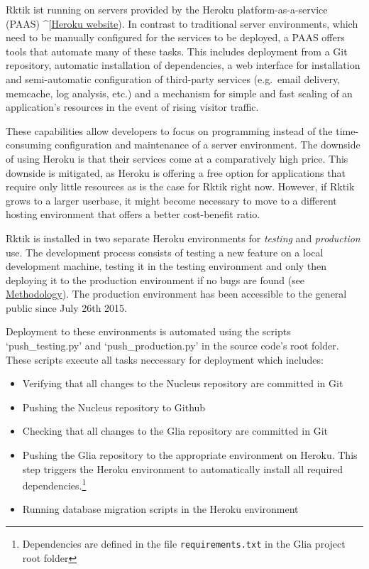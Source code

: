 
Rktik ist running on servers provided by the Heroku
platform-as-a-service (PAAS) \^{}{[}\href{https://www.heroku.com}{Heroku
website}). In contrast to traditional server environments, which need to
be manually configured for the services to be deployed, a PAAS offers
tools that automate many of these tasks. This includes deployment from a
Git repository, automatic installation of dependencies, a web interface
for installation and semi-automatic configuration of third-party
services (e.g.~email delivery, memcache, log analysis, etc.) and a
mechanism for simple and fast scaling of an application's resources in
the event of rising visitor traffic.

These capabilities allow developers to focus on programming instead of
the time-consuming configuration and maintenance of a server
environment. The downside of using Heroku is that their services come at
a comparatively high price. This downside is mitigated, as Heroku is
offering a free option for applications that require only little
resources as is the case for Rktik right now. However, if Rktik grows to
a larger userbase, it might become necessary to move to a different
hosting environment that offers a better cost-benefit ratio.

Rktik is installed in two separate Heroku environments for
\emph{testing} and \emph{production} use. The development process
consists of testing a new feature on a local development machine,
testing it in the testing environment and only then deploying it to the
production environment if no bugs are found (see
\hyperref[methodology]{Methodology}). The production environment has
been accessible to the general public since July 26th 2015.

Deployment to these environments is automated using the scripts
`push\_testing.py' and `push\_production.py' in the source code's root
folder. These scripts execute all tasks neccessary for deployment which
includes:

\begin{itemize}
\tightlist
\item
  Verifying that all changes to the Nucleus repository are committed in
  Git
\item
  Pushing the Nucleus repository to Github
\item
  Checking that all changes to the Glia repository are committed in Git
\item
  Pushing the Glia repository to the appropriate environment on Heroku.
  This step triggers the Heroku environment to automatically install all
  required dependencies.\footnote{Dependencies are defined in the file
    \texttt{requirements.txt} in the Glia project root folder}
\item
  Running database migration scripts in the Heroku environment
\end{itemize}

